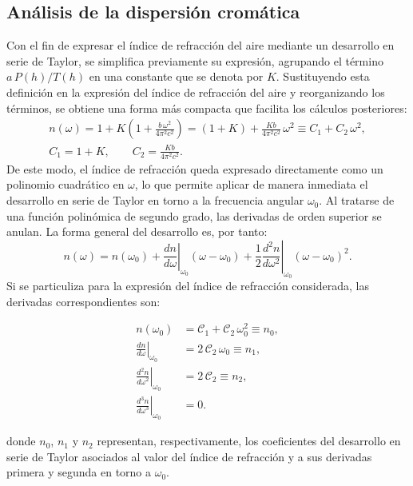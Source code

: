 \subsection{Análisis de la dispersión cromática}
Con el fin de expresar el índice de refracción del aire mediante un desarrollo en serie de Taylor, se simplifica previamente su expresión, agrupando el término  $a\,P(h)/T(h)$ en una constante que se denota por $K$. Sustituyendo esta definición en la expresión del índice de refracción del aire y reorganizando los términos, se obtiene una forma más compacta que facilita los cálculos posteriores:
\begin{equation}
\begin{gathered}
n(\omega)
= 1 + K\left(1 + \frac{b\,\omega^{2}}{4\pi^{2}c^{2}}\right)
= (1+K) + \frac{K b}{4\pi^{2}c^{2}}\,\omega^{2}
\equiv C_{1} + C_{2}\,\omega^{2},\\[4pt]
C_{1} = 1+K,\qquad
C_{2} = \frac{K b}{4\pi^{2}c^{2}}.
\end{gathered}
\end{equation}
De este modo, el índice de refracción queda expresado directamente como un polinomio cuadrático en $\omega$, lo que permite aplicar de manera inmediata el desarrollo en serie de Taylor en torno a la frecuencia angular $\omega_0$. Al tratarse de una función polinómica de segundo grado, las derivadas de orden superior se anulan. La forma general del desarrollo es, por tanto:
\begin{equation}
n(\omega) = n(\omega_0) + \left. \frac{d n}{d \omega} \right|_{\omega_0} (\omega - \omega_0) 
+ \frac{1}{2} \left. \frac{d^2 n}{d \omega^2} \right|_{\omega_0} (\omega - \omega_0)^2.
\end{equation}
Si se particuliza para la expresión del índice de refracción considerada, las derivadas correspondientes son:

\begin{equation}
\begin{aligned}
n(\omega_0) &= \mathcal{C}_1 + \mathcal{C}_2\,\omega_0^2 \equiv n_0,\\
\left. \frac{d n}{d \omega} \right|_{\omega_0} &= 2\,\mathcal{C}_2\,\omega_0 \equiv n_1,\\
\left. \frac{d^2 n}{d \omega^2} \right|_{\omega_0} &= 2\,\mathcal{C}_2 \equiv n_2,\\
\left. \frac{d^3 n}{d \omega^3} \right|_{\omega_0} &= 0.
\end{aligned}
\end{equation}


donde $n_0$, $n_1$ y $n_2$ representan, respectivamente, los coeficientes del desarrollo en serie de Taylor asociados al valor del índice de refracción y a sus derivadas primera y segunda en torno a $\omega_0$.


